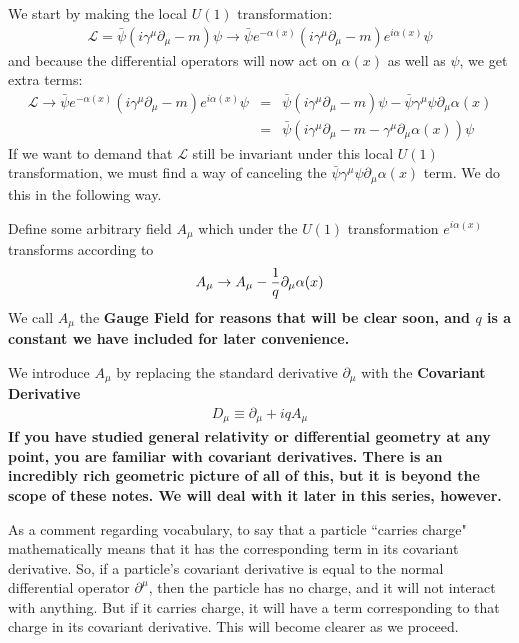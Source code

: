 \documentclass[12pt,epsf]{article}
\def\nolabel{\nonumber }
\def\nolabel{\nonumber }
\begin{document}
We start by making the local $U(1)$ transformation:
\begin{eqnarray}
\mathcal{L} = \bar \psi (i \gamma^{\mu} \partial_{\mu} - m)\psi
\rightarrow \bar \psi e^{-\alpha(x)}(i\gamma^{\mu}\partial_{\mu} -
m)e^{i\alpha(x)}\psi\nolabel
\end{eqnarray}
and because the differential operators will now act on $\alpha(x)$ as
well as $\psi$, we get extra terms:
\begin{eqnarray}
\mathcal{L}  \rightarrow \bar \psi
e^{-\alpha(x)}(i\gamma^{\mu}\partial_{\mu} - m)e^{i\alpha(x)}\psi &=&
\bar \psi (i\gamma^{\mu}\partial_{\mu} - m)\psi - \bar \psi
\gamma^{\mu}\psi \partial_{\mu}\alpha(x) \nolabel \\
&=& \bar \psi(i\gamma^{\mu}\partial_{\mu} - m -
\gamma^{\mu}\partial_{\mu}\alpha(x))\psi\nolabel
\end{eqnarray}
If we want to demand that $\mathcal{L}$ still be invariant under this
local $U(1)$ transformation, we must find a way of canceling the $\bar
\psi \gamma^{\mu} \psi \partial_{\mu}\alpha(x)$ term.  We do this in
the following way.  

Define some arbitrary field $A_{\mu}$ which under the $U(1)$
transformation $e^{i\alpha(x)}$ transforms according to
\begin{eqnarray}
A_{\mu} \rightarrow A_{\mu} - {1\over q}\partial_{\mu}\alpha(x)
\label{eq:emgaugefieldtrans}
\end{eqnarray}
We call $A_{\mu}$ the \bf Gauge Field \rm for reasons that will be
clear soon, and $q$ is a constant we have included for later
convenience.  

We introduce $A_{\mu}$ by replacing the standard derivative
$\partial_{\mu}$ with the \bf Covariant Derivative \rm
\begin{eqnarray}
D_{\mu} \equiv \partial_{\mu} + iqA_{\mu}
\label{eq:covariantderivative}
\end{eqnarray}
If you have studied general relativity or differential geometry at any
point, you are familiar with covariant derivatives.  There is an
incredibly rich geometric picture of all of this, but it is beyond the
scope of these notes.  We will deal with it later in this series,
however.  

As a comment regarding vocabulary, to say that a particle ``carries
charge" mathematically means that it has the corresponding term in its
covariant derivative.  So, if a particle's covariant derivative is
equal to the normal differential operator $\partial^{\mu}$, then the
particle has no charge, and it will not interact with anything.  But if
it carries charge, it will have a term corresponding to that charge in
its covariant derivative.  This will become clearer as we proceed.  
\end{document}
